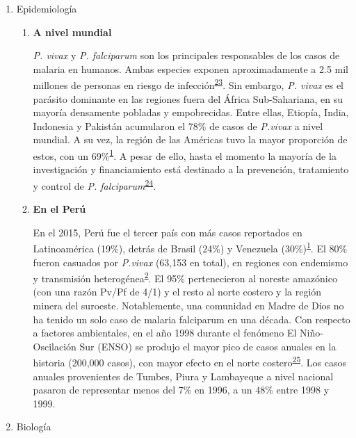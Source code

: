\documentclass[]{article}
\begin{document}
\begin{enumerate}
\def\labelenumi{\alph{enumi}.}
\item
  Epidemiología

  \begin{enumerate}
  \def\labelenumii{\roman{enumii}.}
  \item
    \textbf{A nivel mundial}

    \emph{P. vivax} y \emph{P. falciparum} son los principales
    responsables de los casos de malaria en humanos. Ambas especies
    exponen aproximadamente a 2.5 mil millones de personas en riesgo de
    infección\textsuperscript{\protect\hyperlink{ref-howes2016global}{23}}.
    Sin embargo, \emph{P. vivax} es el parásito dominante en las
    regiones fuera del África Sub-Sahariana, en su mayoría densamente
    pobladas y empobrecidas. Entre ellas, Etiopía, India, Indonesia y
    Pakistán acumularon el 78\% de casos de \emph{P.vivax} a nivel
    mundial. A su vez, la región de las Américas tuvo la mayor
    proporción de estos, con un
    69\%\textsuperscript{\protect\hyperlink{ref-WHO2016world}{1}}. A
    pesar de ello, hasta el momento la mayoría de la investigación y
    financiamiento está destinado a la prevención, tratamiento y control
    de \emph{P.
    falciparum}\textsuperscript{\protect\hyperlink{ref-path2011}{24}}.
  \item
    \textbf{En el Perú}

    En el 2015, Perú fue el tercer país con más casos reportados en
    Latinoamérica (19\%), detrás de Brasil (24\%) y Venezuela
    (30\%)\textsuperscript{\protect\hyperlink{ref-WHO2016world}{1}}. El
    80\% fueron casuados por \emph{P.vivax} (63,153 en total), en
    regiones con endemismo y transmisión
    heterogénea\textsuperscript{\protect\hyperlink{ref-rosas2016peru}{2}}.
    El 95\% pertenecieron al noreste amazónico (con una razón Pv/Pf de
    4/1) y el resto al norte costero y la región minera del suroeste.
    Notablemente, una comunidad en Madre de Dios no ha tenido un solo
    caso de malaria falciparum en una década. Con respecto a factores
    ambientales, en el año 1998 durante el fenómeno El Niño-Oscilación
    Sur (ENSO) se produjo el mayor pico de casos anuales en la historia
    (200,000 casos), con mayor efecto en el norte
    costero\textsuperscript{\protect\hyperlink{ref-gagnon2002enso}{25}}.
    Los casos anuales provenientes de Tumbes, Piura y Lambayeque a nivel
    nacional pasaron de representar menos del 7\% en 1996, a un 48\%
    entre 1998 y 1999.
  \end{enumerate}
\item
  Biología


\end{enumerate}
\end{document}
